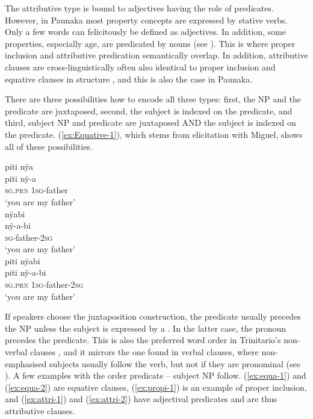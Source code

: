 The attributive type is bound to adjectives having the role of predicates. However, in Paunaka most property concepts are expressed by stative verbs. Only a few words can felicitously be defined as adjectives. In addition, some properties, especially age, are predicated by nouns (see ). This is where proper inclusion and attributive predication semantically overlap. In addition, attributive clauses are cross-linguistically often also identical to proper inclusion and equative clauses in structure \citep[120]{Payne1997}, and this is also the case in Paunaka. 

There are three possibilities how to encode all three types: first, the  NP and the predicate are juxtaposed, second, the subject is indexed on the predicate, and third, subject NP and predicate are juxtaposed AND the subject is indexed on the predicate. (\ref{ex:Equative-1}), which stems from elicitation with Miguel, shows all of these possibilities. 
 
\ea\label{ex:Equative-1}
  \ea
 \begingl 
\glpreamble piti nÿa \\
\gla piti nÿ-a\\ 
\textsc{sg.prn} 1\textsc{sg}-father\\ 
\glft ‘you are my father’\\ 
\endgl
  \ex
 \begingl 
\glpreamble nÿabi\\
\gla nÿ-a-bi\\ 
\textsc{sg}-father-2\textsc{sg}\\ 
\glft ‘you are my father’\\ 
\endgl
  \ex
 \begingl
\glpreamble piti nÿabi\\
\gla piti nÿ-a-bi\\
\textsc{sg.prn} 1\textsc{sg}-father-2\textsc{sg}\\
\glft ‘you are my father’
\endgl
\trailingcitation{[mxx-e090728s-3.088-090]}
\z
\xe

If speakers choose the juxtaposition construction, the predicate usually precedes the  NP unless the subject is expressed by a . In the latter case, the pronoun precedes the predicate. This is also the preferred word order in Trinitario’s non-verbal clauses \citep[75]{Rose2018}, and it mirrors the one found in verbal clauses, where non-emphasised subjects usually follow the verb, but not if they are pronominal (see ). A few examples with the order predicate -- subject NP follow. (\ref{ex:equa-1}) and (\ref{ex:equa-2}) are equative clauses, (\ref{ex:propi-1}) is an example of proper inclusion, and (\ref{ex:attri-1}) and (\ref{ex:attri-2}) have adjectival predicates and are thus attributive clauses.

